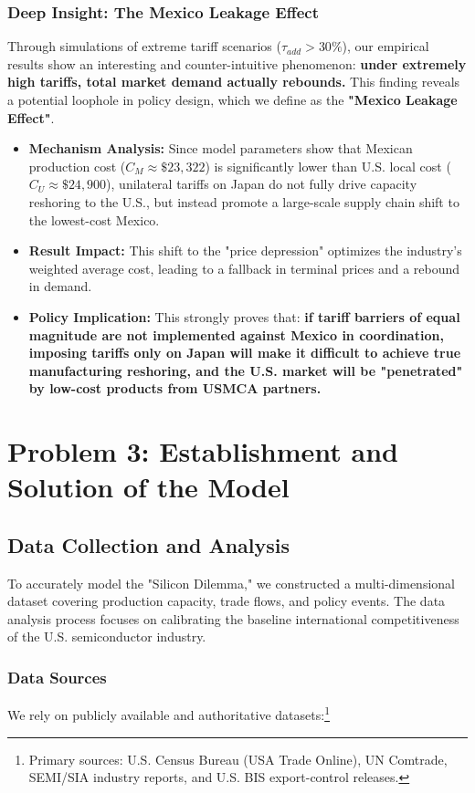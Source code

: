 \documentclass{apmcmthesis}
\begin{document}
\subsubsection{Deep Insight: The Mexico Leakage Effect}
Through simulations of extreme tariff scenarios ($\tau_{add} > 30\%$), our empirical results show an interesting and counter-intuitive phenomenon: \textbf{under extremely high tariffs, total market demand actually rebounds.} This finding reveals a potential loophole in policy design, which we define as the \textbf{"Mexico Leakage Effect"}.

\begin{itemize}
    \item \textbf{Mechanism Analysis:} Since model parameters show that Mexican production cost ($C_M \approx \$23,322$) is significantly lower than U.S. local cost ($C_U \approx \$24,900$), unilateral tariffs on Japan do not fully drive capacity reshoring to the U.S., but instead promote a large-scale supply chain shift to the lowest-cost Mexico.
    \item \textbf{Result Impact:} This shift to the "price depression" optimizes the industry's weighted average cost, leading to a fallback in terminal prices and a rebound in demand.
    \item \textbf{Policy Implication:} This strongly proves that: \textbf{if tariff barriers of equal magnitude are not implemented against Mexico in coordination, imposing tariffs only on Japan will make it difficult to achieve true manufacturing reshoring, and the U.S. market will be "penetrated" by low-cost products from USMCA partners.}
\end{itemize}


\section{Problem 3: Establishment and Solution of the Model}

\subsection{Data Collection and Analysis}
To accurately model the "Silicon Dilemma," we constructed a multi-dimensional dataset covering production capacity, trade flows, and policy events. The data analysis process focuses on calibrating the baseline international competitiveness of the U.S. semiconductor industry.

\subsubsection{Data Sources}
We rely on publicly available and authoritative datasets:\footnote{Primary sources: U.S. Census Bureau (USA Trade Online), UN Comtrade, SEMI/SIA industry reports, and U.S. BIS export-control releases.}
\end{document}
